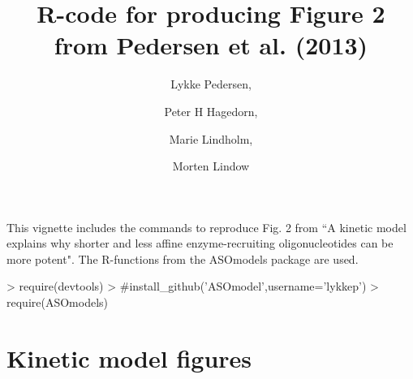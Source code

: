 \documentclass{article}
\title{R-code for producing Figure 2 from Pedersen et al. (2013)}
\author{Lykke Pedersen, \and Peter H Hagedorn, \and Marie Lindholm, \and Morten Lindow}
\date{}
\begin{document}



\maketitle
This vignette includes the commands to reproduce Fig. 2 from ``A kinetic model explains why shorter and less
affine enzyme-recruiting oligonucleotides can be
more potent". The R-functions from the ASOmodels package are used.
\begin{Schunk}
\begin{Sinput}
> require(devtools)
> #install_github('ASOmodel',username='lykkep')
> require(ASOmodels)
\end{Sinput}
\end{Schunk}

\section*{Kinetic model figures}

\end{document}
